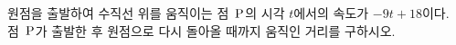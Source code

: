 원점을 출발하여 수직선 위를 움직이는 점~$\mathrm{P}$의 시각 $t$에서의 속도가 $-9t+18$이다. 점~$\mathrm{P}$가 출발한 후 원점으로 다시 돌아올 때까지 움직인 거리를 구하시오.
